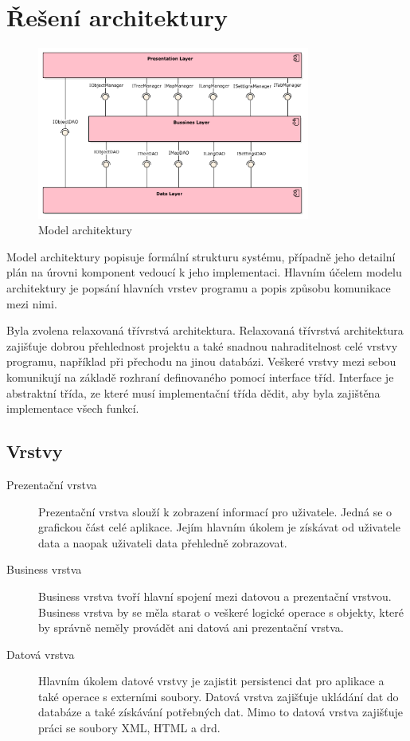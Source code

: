 \documentclass[thesis=B,czech]{resources/FITthesis}[2012/06/26]
\begin{document}
	\section{Řešení architektury}
\begin{figure}\centering
	\includegraphics[width=0.8\textwidth]{images/architektura}
	\caption[Model architektury]{Model architektury}\label{fig:architektura}
\end{figure}
Model architektury popisuje formální strukturu systému, případně jeho detailní plán na úrovni komponent vedoucí k jeho implementaci. Hlavním účelem modelu architektury je popsání hlavních vrstev programu a popis způsobu komunikace mezi nimi.\par

Byla zvolena relaxovaná třívrstvá architektura. Relaxovaná třívrstvá architektura zajišťuje dobrou přehlednost projektu a také snadnou nahraditelnost celé vrstvy programu, například při přechodu na jinou databázi. Veškeré vrstvy mezi sebou komunikují na základě rozhraní definovaného pomocí interface tříd. Interface je abstraktní třída, ze které musí implementační třída dědit, aby byla zajištěna implementace všech funkcí.

\subsection{Vrstvy}
\begin{description}
	\item[Prezentační vrstva] Prezentační vrstva slouží k zobrazení informací pro uživatele. Jedná se o grafickou část celé aplikace. Jejím hlavním úkolem je získávat od uživatele data a naopak uživateli data přehledně zobrazovat. 
	
	\item[Business vrstva] Business vrstva tvoří hlavní spojení mezi datovou a prezentační vrstvou. Business vrstva by se měla starat o veškeré logické operace s objekty, které by správně neměly provádět ani datová ani prezentační vrstva.
	
	\item[Datová vrstva] Hlavním úkolem datové vrstvy je zajistit persistenci dat pro aplikace a také operace s externími soubory. Datová vrstva zajišťuje ukládání dat do databáze a také získávání potřebných dat. Mimo to datová vrstva zajišťuje práci se soubory XML, HTML a drd. 
	
\end{description}
\end{document}
